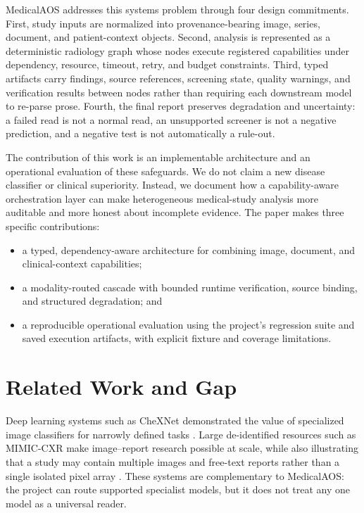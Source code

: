 \documentclass[a4paper,conference]{IEEEtran}
\begin{document}
MedicalAOS addresses this systems problem through four design commitments. First, study inputs are normalized into provenance-bearing image, series, document, and patient-context objects. Second, analysis is represented as a deterministic radiology graph whose nodes execute registered capabilities under dependency, resource, timeout, retry, and budget constraints. Third, typed artifacts carry findings, source references, screening state, quality warnings, and verification results between nodes rather than requiring each downstream model to re-parse prose. Fourth, the final report preserves degradation and uncertainty: a failed read is not a normal read, an unsupported screener is not a negative prediction, and a negative test is not automatically a rule-out.

The contribution of this work is an implementable architecture and an operational evaluation of these safeguards. We do not claim a new disease classifier or clinical superiority. Instead, we document how a capability-aware orchestration layer can make heterogeneous medical-study analysis more auditable and more honest about incomplete evidence. The paper makes three specific contributions:
\begin{itemize}
  \item a typed, dependency-aware architecture for combining image, document, and clinical-context capabilities;
  \item a modality-routed cascade with bounded runtime verification, source binding, and structured degradation; and
  \item a reproducible operational evaluation using the project's regression suite and saved execution artifacts, with explicit fixture and coverage limitations.
\end{itemize}

\section{Related Work and Gap}
Deep learning systems such as CheXNet demonstrated the value of specialized image classifiers for narrowly defined tasks \cite{rajpurkar2017chexnet}. Large de-identified resources such as MIMIC-CXR make image--report research possible at scale, while also illustrating that a study may contain multiple images and free-text reports rather than a single isolated pixel array \cite{johnson2019mimic}. These systems are complementary to MedicalAOS: the project can route supported specialist models, but it does not treat any one model as a universal reader.
\end{document}
